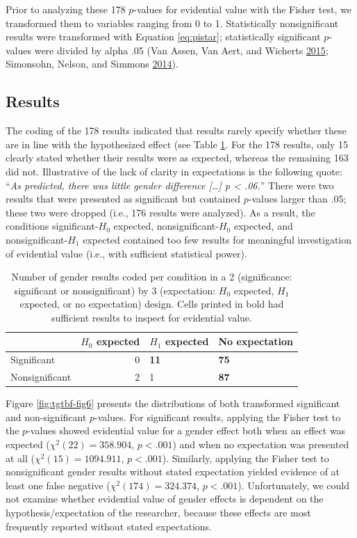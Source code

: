 \documentclass[a5paper]{book}
\begin{document}
Prior to analyzing these 178 \(p\)-values for evidential value with the
Fisher test, we transformed them to variables ranging from 0 to 1.
Statistically nonsignificant results were transformed with Equation
\eqref{eq:pistar}; statistically significant \(p\)-values were divided by
alpha .05 (Van Assen, Van Aert, and Wicherts
\protect\hyperlink{ref-doi:10.1037ux2fmet0000025}{2015}; Simonsohn,
Nelson, and Simmons
\protect\hyperlink{ref-doi:10.1037ux2fa0033242}{2014}).

\subsection{Results}\label{results-1}

The coding of the 178 results indicated that results rarely specify
whether these are in line with the hypothesized effect (see Table
\ref{tab:tgtbf-tab5}. For the 178 results, only 15 clearly stated
whether their results were as expected, whereas the remaining 163 did
not. Illustrative of the lack of clarity in expectations is the
following quote: \enquote{\emph{As predicted, there was little gender
difference {[}\ldots{}{]} p \textless{} .06.}} There were two results
that were presented as significant but contained \(p\)-values larger
than .05; these two were dropped (i.e., 176 results were analyzed). As a
result, the conditions significant-\(H_0\) expected,
nonsignificant-\(H_0\) expected, and nonsignificant-\(H_1\) expected
contained too few results for meaningful investigation of evidential
value (i.e., with sufficient statistical power).

\begin{table}[!h]

\caption{\label{tab:tgtbf-tab5}Number of gender results coded per condition in a 2 (significance: significant or nonsignificant) by 3 (expectation: $H_0$ expected, $H_1$ expected, or no expectation) design. Cells printed in bold had sufficient results to inspect for evidential value.}
\centering
\begin{tabular}{lrll}
\toprule
 & $H_0$ expected & $H_1$ expected & No expectation\\
\midrule
\rowcolor{gray!6}  Significant & 0 & \textbf{11} & \textbf{75}\\
Nonsignificant & 2 & 1 & \textbf{87}\\
\bottomrule
\end{tabular}
\end{table}

Figure \ref{fig:tgtbf-fig6} presents the distributions of both
transformed significant and non-significant \(p\)-values. For
significant results, applying the Fisher test to the \(p\)-values showed
evidential value for a gender effect both when an effect was expected
(\(\chi^2(22)=358.904\), \(p<.001\)) and when no expectation was
presented at all (\(\chi^2(15)=1094.911\), \(p<.001\)). Similarly,
applying the Fisher test to nonsignificant gender results without stated
expectation yielded evidence of at least one false negative
(\(\chi^2(174)=324.374\), \(p<.001\)). Unfortunately, we could not
examine whether evidential value of gender effects is dependent on the
hypothesis/expectation of the researcher, because these effects are most
frequently reported without stated expectations.
\end{document}
